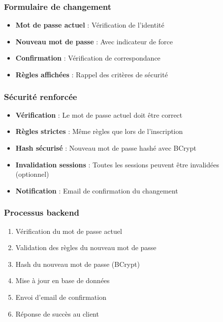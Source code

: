 \documentclass[a4paper,11pt]{report}
\begin{document}
\subsubsection{Formulaire de changement}

\begin{itemize}
    \item \textbf{Mot de passe actuel} : Vérification de l'identité
    \item \textbf{Nouveau mot de passe} : Avec indicateur de force
    \item \textbf{Confirmation} : Vérification de correspondance
    \item \textbf{Règles affichées} : Rappel des critères de sécurité
\end{itemize}

\subsubsection{Sécurité renforcée}

\begin{itemize}
    \item \textbf{Vérification} : Le mot de passe actuel doit être correct
    \item \textbf{Règles strictes} : Même règles que lors de l'inscription
    \item \textbf{Hash sécurisé} : Nouveau mot de passe hashé avec BCrypt
    \item \textbf{Invalidation sessions} : Toutes les sessions peuvent être invalidées (optionnel)
    \item \textbf{Notification} : Email de confirmation du changement
\end{itemize}

\subsubsection{Processus backend}

\begin{enumerate}
    \item Vérification du mot de passe actuel
    \item Validation des règles du nouveau mot de passe
    \item Hash du nouveau mot de passe (BCrypt)
    \item Mise à jour en base de données
    \item Envoi d'email de confirmation
    \item Réponse de succès au client
\end{enumerate}
\end{document}
